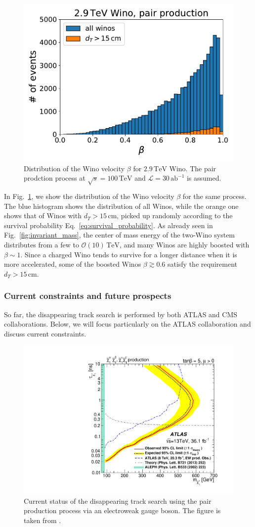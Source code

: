 \documentclass[12pt,twoside,book]{article}
\begin{document}
\begin{figure}[t]
  \centering
  \includegraphics[width=0.5\hsize]{beta.pdf}
  \caption{
    Distribution of the Wino velocity $\beta$ for $2.9\,\mathrm{TeV}$ Wino.
    The pair prodction process at $\sqrt{s}=100\,\mathrm{TeV}$ and $\mathcal{L} = 30\,\mathrm{ab}^{-1}$ is assumed.
  }
  \label{fig:beta}
\end{figure}

In Fig.~\ref{fig:beta}, we show the distribution of the Wino velocity $\beta$ for the same process.
The blue histogram shows the distribution of all Winos, while the orange one shows that of Winos with $d_T > 15\,\mathrm{cm}$, picked up randomly according to the survival probability Eq.~\eqref{eq:survival_probability}.
As already seen in Fig.~\ref{fig:invariant_mass}, the center of mass energy of the two-Wino system distributes from a few to $\mathcal{O} (10) \,\mathrm{TeV}$, and many Winos are highly boosted with $\beta \sim 1$.
Since a charged Wino tends to survive for a longer distance when it is more accelerated, some of the boosted Winos $\beta \gtrsim 0.6$ satisfy the requirement $d_T > 15\,\mathrm{cm}$.


\subsubsection*{Current constraints and future prospects}

So far, the disappearing track search is performed by both ATLAS \cite{Aaboud:2017mpt} and CMS \cite{Sirunyan:2018ldc} collaborations.
Below, we will focus particularly on the ATLAS collaboration and discuss current constraints.

\begin{figure}[t]
  \centering
  \includegraphics[width=0.5\hsize]{ATLAS_disappearing_track.pdf}
  \caption{
    Current status of the disappearing track search using the pair production process via an electroweak gauge boson.
    The figure is taken from \cite{Aaboud:2017mpt}.
  }
  \label{fig:ATLAS_disappearing_track}
\end{figure}
\end{document}
